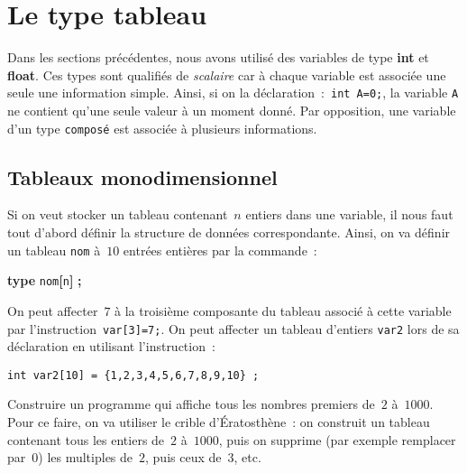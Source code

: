 \section{Le type tableau}
\label{sec:TypeTableau}
Dans les sections pr\'ec\'edentes, nous avons utilis\'e des variables de type
\textbf{int} et   \textbf{float}.  Ces types   sont qualifi\'es de
\textit{scalaire} car \`a chaque variable est associ\'ee une seule une
information   simple.  Ainsi,  si  on la   d\'eclaration~:~\texttt{int
  A=0;}, la variable \texttt{A} ne contient qu'une seule valeur \`a un
moment donn\'e.      Par    opposition,  une   variable     d'un  type
\texttt{compos\'e} est associ\'ee \`a plusieurs informations.
\subsection{Tableaux monodimensionnel}
\label{sec:Tableaumonodimensionel}
Si on veut stocker un tableau contenant~$n$ entiers dans une variable,
il  nous  faut  tout  d'abord   d\'efinir la   structure  de donn\'ees
correspondante.  Ainsi, on va d\'efinir un tableau \texttt{nom}
\`a~$10$ entr\'ees enti\`eres par la commande~:%
\par
\centerline{\textbf{type}   \texttt{nom}\textbf{[}\texttt{n}\textbf{]}
  \textbf{;}}
\par
On   peut affecter~$7$   \`a la   troisi\`eme  composante du   tableau
associ\'e \`a cette variable par l'instruction~\texttt{var[3]=7;}.  On
peut  affecter  un   tableau  d'entiers  \texttt{var2}   lors  de   sa
d\'eclaration en utilisant l'instruction~:
\begin{verbatim}
int var2[10] = {1,2,3,4,5,6,7,8,9,10} ;
\end{verbatim}
\begin{exercice}
  Construire un programme qui affiche tous les nombres premiers de~$2$
  \`a~$1000$.      Pour  ce  faire,   on   va    utiliser   le  crible
  d'\'Eratosth\`ene~: on construit   un  tableau contenant  tous   les
  entiers de~$2$ \`a~$1000$,  puis on supprime  (par exemple remplacer
  par~$0$) les multiples de~$2$, puis ceux de~$3$, etc.
  \ifcorrection
  \begin{correction}
    
  \end{correction}
  \fi
\end{exercice}
